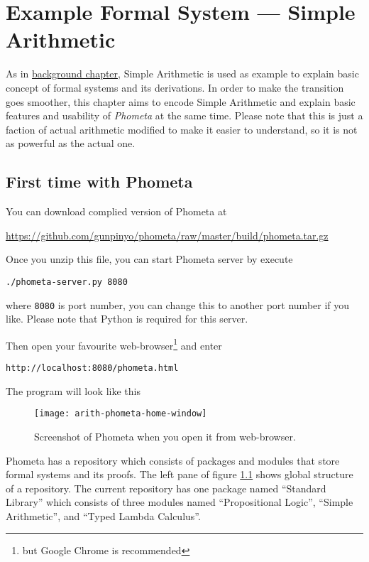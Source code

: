 \documentclass[master.tex]{subfiles}
\begin{document}
\chapter{Example Formal System --- Simple Arithmetic}
\label{chap:example_simple_arithmetic}

As in \hyperref[chap:background]{background chapter}, Simple Arithmetic is
used as example to explain basic concept of formal systems and its derivations.
In order to make the transition goes smoother, this chapter aims to encode
Simple Arithmetic and explain basic features and usability of \emph{Phometa} at
the same time. Please note that this is just a faction of
actual arithmetic modified to make it easier to understand, so it is not as
powerful as the actual one.

\section{First time with Phometa}

You can download complied version of Phometa at

{\centering\url{https://github.com/gunpinyo/phometa/raw/master/build/phometa.tar.gz}}

Once you unzip this file, you can start Phometa server by execute

\texttt{./phometa-server.py 8080}

where \texttt{8080} is port number, you can change this to another port number
if you like. Please note that Python is required for this server.

Then open your favourite web-browser\footnote{but Google Chrome is recommended}
and enter

\texttt{http://localhost:8080/phometa.html}

The program will look like this

\begin{figure}[H]
    \centering
    \texttt{[image: arith-phometa-home-window]}
    \caption{Screenshot of Phometa when you open it from web-browser.}
\label{fig:arith-phometa-home-window}
\end{figure}

Phometa has a repository which consists of packages and modules that store
formal systems and its proofs. The left pane of figure
\ref{fig:arith-phometa-home-window} shows global structure of a repository. The
current repository has one package named ``Standard Library'' which consists of
three modules named ``Propositional Logic'', ``Simple Arithmetic'', and ``Typed
Lambda Calculus''.
\end{document}
